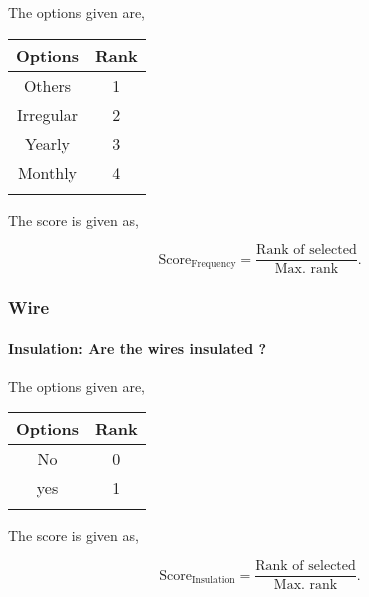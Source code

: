\documentclass[oneside,twocolumn]{article}
\newcommand{\tsub}[2]{\text{#1}_{\text{#2}}}
\newcommand{\dsub}[2]{\dfrac{\text{#1}}{\text{#2}}}
\newcommand{\singsel}[1]
{
	\[
		\tsub{Score}{#1} = \dsub{Rank of selected}{Max. rank}.
	\]
}
\newenvironment{ttable}
{
\begin{center}
\begin{tabular}{c|c}
\hline
}
{
\\ \hline
\end{tabular}
\end{center}
}
\begin{document}
The options given are,
\begin{ttable}
Options & Rank \\ \hline
Others & 1 \\
Irregular & 2 \\
Yearly & 3 \\
Monthly & 4 \\
\hline
\end{ttable}
The score is given as,
\singsel{Frequency}
\subsubsection{Wire}

\paragraph{Insulation: Are the wires insulated ?}

The options given are,
\begin{ttable}
Options & Rank \\ \hline
No & 0 \\
yes & 1 \\
\hline
\end{ttable}
The score is given as,
\singsel{Insulation}
\end{document}
